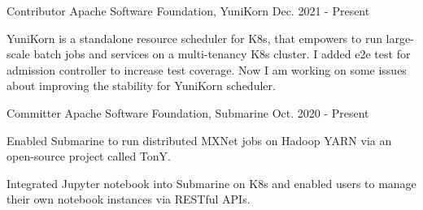 

\begin{cventries}

  \cventry
    {Contributor} %
    {Apache Software Foundation, YuniKorn} %
    {} %
    {Dec. 2021 - Present} %
    {
      \begin{cvitems} %
        \item {YuniKorn is a standalone resource scheduler for K8s, that empowers to run large-scale batch jobs and services on a multi-tenancy K8s cluster. I added e2e test for admission controller to increase test coverage. Now I am working on some issues about improving the stability for YuniKorn scheduler.}
      \end{cvitems}
    }
  \cventry
    {Committer} %
    {Apache Software Foundation, Submarine} %
    {} %
    {Oct. 2020 - Present} %
    {
      \begin{cvitems} %
        \item {Enabled Submarine to run distributed MXNet jobs on Hadoop YARN via an open-source project called TonY.}
        \item {Integrated Jupyter notebook into Submarine on K8s and enabled users to manage their own notebook instances via RESTful APIs.}
      \end{cvitems}
    }
\end{cventries}
